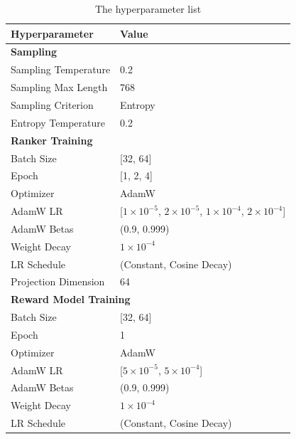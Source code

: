 \documentclass{article}
\begin{document}
\begin{table}[htbp]
\centering
\caption{The hyperparameter list}
\label{tab:hyperparameters}
\begin{tabular}{ll}
\toprule
\textbf{Hyperparameter} & \textbf{Value} \\
\midrule
\multicolumn{2}{l}{\textbf{Sampling}} \\
\midrule
Sampling Temperature & 0.2 \\
Sampling Max Length & 768 \\
Sampling Criterion & Entropy \\
Entropy Temperature & 0.2 \\
\midrule
\multicolumn{2}{l}{\textbf{Ranker Training}} \\
\midrule
Batch Size & [32, 64] \\
Epoch & [1, 2, 4] \\
Optimizer & AdamW \\
AdamW LR & [$1\times 10^{-5}$, $2\times 10^{-5}$, $1\times 10^{-4}$, $2\times 10^{-4}$] \\
AdamW Betas & (0.9, 0.999) \\
Weight Decay & $1\times 10^{-4}$ \\
LR Schedule & (Constant, Cosine Decay) \\
Projection Dimension & 64 \\
\midrule
\multicolumn{2}{l}{\textbf{Reward Model Training}} \\
\midrule
Batch Size & [32, 64] \\
Epoch & 1 \\
Optimizer & AdamW \\
AdamW LR & [$5\times 10^{-5}$, $5\times 10^{-4}$] \\
AdamW Betas & (0.9, 0.999) \\
Weight Decay & $1\times 10^{-4}$ \\
LR Schedule & (Constant, Cosine Decay) \\
\bottomrule
\end{tabular}
\end{table}
\end{document}

